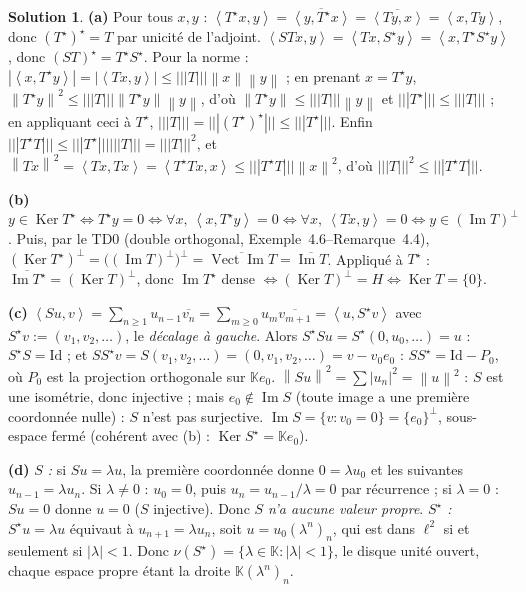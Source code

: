 \documentclass[11pt,a4paper]{article}
\newcommand{\K}{\mathbb{K}}
\newcommand{\adh}[1]{\overline{#1}}
\newcommand{\Vect}{\operatorname{Vect}}
\newcommand{\norm}[1]{\left\|#1\right\|}
\newcommand{\opnorm}[1]{|\!|\!|#1|\!|\!|}
\newcommand{\ps}[2]{\left\langle #1,#2\right\rangle}
\DeclareMathOperator{\Ker}{Ker}
\DeclareMathOperator{\Ima}{Im}
\theoremstyle{definition}
\newtheorem*{solution}{Solution}
\begin{document}
\begin{solution}
\noindent\textbf{(a)} Pour tous $x,y$ : $\ps{T^\star x}y=\overline{\ps y{T^\star x}}=\overline{\ps{Ty}x}=\ps x{Ty}$, donc $(T^\star)^\star=T$ par unicité de l'adjoint. $\ps{STx}y=\ps{Tx}{S^\star y}=\ps x{T^\star S^\star y}$, donc $(ST)^\star=T^\star S^\star$. Pour la norme : $|\ps x{T^\star y}|=|\ps{Tx}y|\le\opnorm T\norm x\norm y$ ; en prenant $x=T^\star y$, $\norm{T^\star y}^2\le\opnorm T\norm{T^\star y}\norm y$, d'où $\norm{T^\star y}\le\opnorm T\norm y$ et $\opnorm{T^\star}\le\opnorm T$ ; en appliquant ceci à $T^\star$, $\opnorm T=\opnorm{(T^\star)^\star}\le\opnorm{T^\star}$. Enfin $\opnorm{T^\star T}\le\opnorm{T^\star}\opnorm T=\opnorm T^2$, et $\norm{Tx}^2=\ps{Tx}{Tx}=\ps{T^\star Tx}x\le\opnorm{T^\star T}\norm x^2$, d'où $\opnorm T^2\le\opnorm{T^\star T}$.

\medskip
\noindent\textbf{(b)} $y\in\Ker T^\star\iff T^\star y=0\iff\forall x,\ \ps x{T^\star y}=0\iff\forall x,\ \ps{Tx}y=0\iff y\in(\Ima T)^\perp$. Puis, par le TD0 (double orthogonal, Exemple~4.6--Remarque~4.4), $(\Ker T^\star)^\perp=\big((\Ima T)^\perp\big)^\perp=\adh{\Vect\Ima T}=\adh{\Ima T}$. Appliqué à $T^\star$ : $\adh{\Ima T^\star}=(\Ker T)^\perp$, donc $\Ima T^\star$ dense $\iff(\Ker T)^\perp=H\iff\Ker T=\{0\}$.

\medskip
\noindent\textbf{(c)} $\ps{Su}v=\sum_{n\ge1}u_{n-1}\overline{v_n}=\sum_{m\ge0}u_m\overline{v_{m+1}}=\ps u{S^\star v}$ avec $S^\star v:=(v_1,v_2,\dots)$, le \emph{décalage à gauche}. Alors $S^\star Su=S^\star(0,u_0,\dots)=u$ : $S^\star S=\mathrm{Id}$ ; et $SS^\star v=S(v_1,v_2,\dots)=(0,v_1,v_2,\dots)=v-v_0e_0$ : $SS^\star=\mathrm{Id}-P_0$, où $P_0$ est la projection orthogonale sur $\K e_0$. $\norm{Su}^2=\sum|u_n|^2=\norm u^2$ : $S$ est une isométrie, donc injective ; mais $e_0\notin\Ima S$ (toute image a une première coordonnée nulle) : $S$ n'est pas surjective. $\Ima S=\{v:v_0=0\}=\{e_0\}^\perp$, sous-espace fermé (cohérent avec (b) : $\Ker S^\star=\K e_0$).

\medskip
\noindent\textbf{(d)} \emph{$S$ :} si $Su=\lambda u$, la première coordonnée donne $0=\lambda u_0$ et les suivantes $u_{n-1}=\lambda u_n$. Si $\lambda\ne0$ : $u_0=0$, puis $u_n=u_{n-1}/\lambda=0$ par récurrence ; si $\lambda=0$ : $Su=0$ donne $u=0$ ($S$ injective). Donc \emph{$S$ n'a aucune valeur propre}. \emph{$S^\star$ :} $S^\star u=\lambda u$ équivaut à $u_{n+1}=\lambda u_n$, soit $u=u_0(\lambda^n)_n$, qui est dans $\ell^2$ si et seulement si $|\lambda|<1$. Donc $\nu(S^\star)=\{\lambda\in\K:|\lambda|<1\}$, le disque unité ouvert, chaque espace propre étant la droite $\K(\lambda^n)_n$.


\end{solution}
\end{document}
